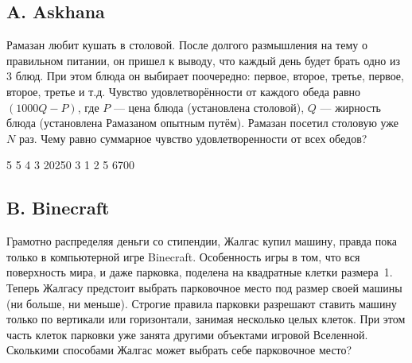 \subsection*{A. Askhana}


Рамазан любит кушать в столовой. После долгого размышления на тему о правильном питании, он пришел к выводу, что каждый день будет брать одно из 3 блюд. При этом блюда он выбирает поочередно: первое, второе, третье, первое, второе, третье и т.д. Чувство удовлетворённости от каждого обеда равно $(1000 Q - P)$, где $P$ --- цена блюда (установлена столовой), $Q$ --- жирность блюда (установлена Рамазаном опытным путём). Рамазан посетил столовую уже $N$ раз. Чему равно суммарное чувство удовлетворенности от всех обедов?



\examplee
{5  5  4  3}
{20250}
{3  1  2  5}
{6700}



\subsection*{B. Binecraft}


Грамотно распределяя деньги со стипендии, Жалгас купил машину, правда пока только в компьютерной игре Binecraft. Особенность игры в том, что вся поверхность мира, и даже парковка, поделена на квадратные клетки размера~1. Теперь Жалгасу предстоит выбрать парковочное место под размер своей машины (ни больше, ни меньше). Строгие правила парковки разрешают ставить машину только по вертикали или горизонтали, занимая несколько целых клеток. При этом часть клеток парковки уже занята другими объектами игровой Вселенной. Сколькими способами Жалгас может выбрать себе парковочное место?


